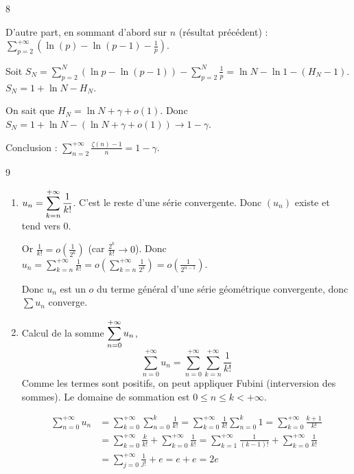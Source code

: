 \begin{correction}{8}
\begin{itemize}
        D'autre part, en sommant d'abord sur $n$ (résultat précédent) :
        $\displaystyle \sum_{p=2}^{+\infty} \left(\ln(p) - \ln(p-1) - \frac{1}{p}\right)$.
        
        Soit $\displaystyle S_N = \sum_{p=2}^N (\ln p - \ln(p-1)) - \sum_{p=2}^N \frac{1}{p} = \ln N - \ln 1 - (H_N - 1)$.
        $S_N = 1 + \ln N - H_N$.

        On sait que $H_N = \ln N + \gamma + o(1)$.
        Donc $S_N = 1 + \ln N - (\ln N + \gamma + o(1)) \to 1 - \gamma$.

        Conclusion : $\displaystyle \sum_{n=2}^{+\infty} \frac{\zeta(n)-1}{n} = 1-\gamma$.
\end{itemize}
\end{correction}

\begin{correction}{9}
\begin{enumerate}
    \item 
        $\displaystyle u_n = \sum_{k=n}^{+ \infty} \frac{1}{k!}$. C'est le reste d'une série convergente. Donc $(u_n)$ existe et tend vers 0.
    
        Or $\frac{1}{k!} = o\left(\frac{1}{2^k}\right)$ (car $\frac {2^k} {k!} \to 0$).
        Donc $\displaystyle u_n = \sum_{k=n}^{+\infty} \frac{1}{k!} = o \left(\sum_{k=n}^{+\infty} \frac{1}{2^k} \right) = o \left(\frac{1}{2^{n-1}}\right)$.
        
        Donc $u_n$ est un $o$ du terme général d'une série géométrique convergente, donc $\sum u_n$ converge.

    \item Calcul de la somme $\displaystyle \sum_{n=0}^{+ \infty} u_n$,
        $$ \sum_{n=0}^{+\infty} u_n = \sum_{n=0}^{+\infty} \sum_{k=n}^{+\infty} \frac{1}{k!} $$
        Comme les termes sont positifs, on peut appliquer Fubini (interversion des sommes).
        Le domaine de sommation est $0 \leqslant n \leqslant k < +\infty$.
        
        \begin{align*}
            \sum_{n=0}^{+\infty} u_n &= \sum_{k=0}^{+\infty} \sum_{n=0}^k \frac{1}{k!} = \sum_{k=0}^{+\infty} \frac{1}{k!} \sum_{n=0}^k 1 = \sum_{k=0}^{+\infty} \frac{k+1}{k!} \\
            &= \sum_{k=0}^{+\infty} \frac{k}{k!} + \sum_{k=0}^{+\infty} \frac{1}{k!} = \sum_{k=1}^{+\infty} \frac{1}{(k-1)!} + \sum_{k=0}^{+\infty} \frac{1}{k!} \\
            &= \sum_{j=0}^{+\infty} \frac{1}{j!} + e = e + e = 2e
        \end{align*}
\end{enumerate}
\end{correction}

